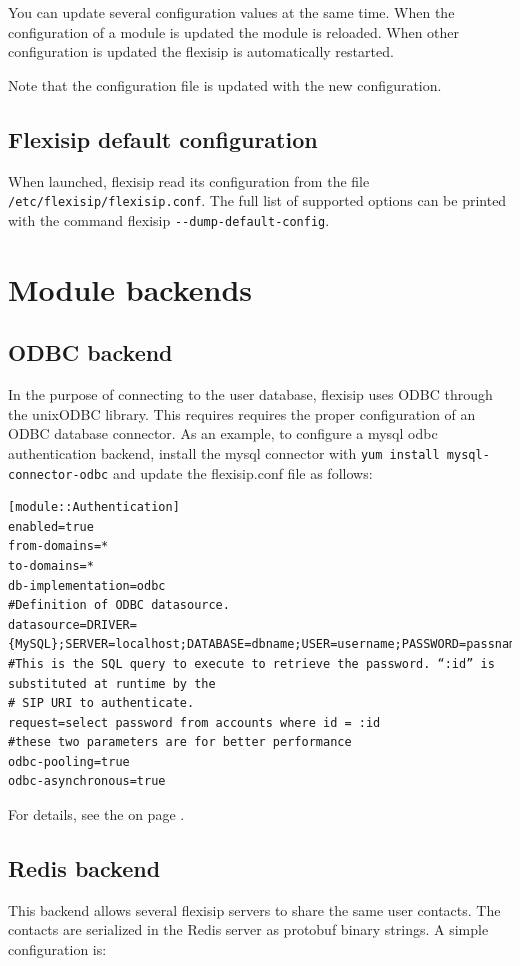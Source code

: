 \documentclass[a4paper,10pt]{article}
\begin{document}
You can update several configuration values at the same time.
When the configuration of a module is updated the module is reloaded.
When other configuration is updated the flexisip is automatically restarted.

Note that the configuration file is updated with the new configuration.


\subsection{Flexisip default configuration}
When launched, flexisip read its configuration from the file \verb|/etc/flexisip/flexisip.conf|.
The full list of supported options can be printed with the command flexisip \verb|--dump-default-config|.


\section{Module backends}


\subsection{ODBC backend}
In the purpose of connecting to the user database, flexisip uses ODBC through the unixODBC library.
This requires requires the proper configuration of an ODBC database connector.
As an example, to configure a mysql odbc authentication backend, install the mysql connector with \verb|yum install mysql-connector-odbc|
and update the flexisip.conf file as follows:


\begin{verbatim} 
[module::Authentication]
enabled=true
from-domains=*
to-domains=*
db-implementation=odbc
#Definition of ODBC datasource.
datasource=DRIVER={MySQL};SERVER=localhost;DATABASE=dbname;USER=username;PASSWORD=passname;OPTION=3;
#This is the SQL query to execute to retrieve the password. “:id” is substituted at runtime by the 
# SIP URI to authenticate.
request=select password from accounts where id = :id
#these two parameters are for better performance
odbc-pooling=true
odbc-asynchronous=true
\end{verbatim} 

For details, see the  on page \pageref{module::Authentication}.


\subsection{Redis backend}
This backend allows several flexisip servers to share the same user contacts.
The contacts are serialized in the Redis server as protobuf binary strings.
A simple configuration is:
\end{document}
